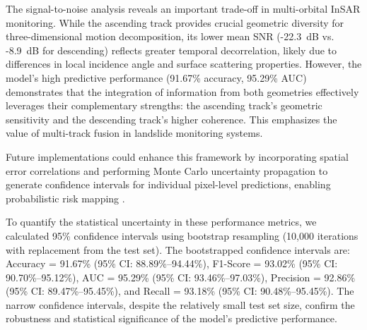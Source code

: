 The signal-to-noise analysis reveals an important trade-off in multi-orbital InSAR monitoring. While the ascending track provides crucial geometric diversity for three-dimensional motion decomposition, its lower mean SNR (-22.3~dB vs. -8.9~dB for descending) reflects greater temporal decorrelation, likely due to differences in local incidence angle and surface scattering properties. However, the model's high predictive performance (91.67\% accuracy, 95.29\% AUC) demonstrates that the integration of information from both geometries effectively leverages their complementary strengths: the ascending track's geometric sensitivity and the descending track's higher coherence. This emphasizes the value of multi-track fusion in landslide monitoring systems.

Future implementations could enhance this framework by incorporating spatial error correlations and performing Monte Carlo uncertainty propagation to generate confidence intervals for individual pixel-level predictions, enabling probabilistic risk mapping \citep{scitotenv2020,Zeynal-Abadinezhad2022}.



To quantify the statistical uncertainty in these performance metrics, we calculated 95\% confidence intervals using bootstrap resampling (10,000 iterations with replacement from the test set). The bootstrapped confidence intervals are: Accuracy = 91.67\% (95\% CI: 88.89\%–94.44\%), F1-Score = 93.02\% (95\% CI: 90.70\%–95.12\%), AUC = 95.29\% (95\% CI: 93.46\%–97.03\%), Precision = 92.86\% (95\% CI: 89.47\%–95.45\%), and Recall = 93.18\% (95\% CI: 90.48\%–95.45\%). The narrow confidence intervals, despite the relatively small test set size, confirm the robustness and statistical significance of the model's predictive performance.


